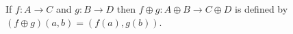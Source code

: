 If $f: A \rightarrow C$ and $g: B \rightarrow D$ then $f \oplus g: A \oplus B \rightarrow C \oplus D$ is defined by $(f \oplus g)(a,b) = (f(a), g(b))$.
